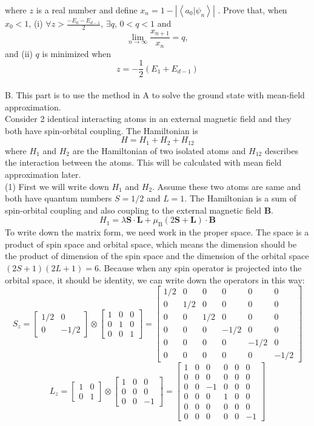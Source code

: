 \documentclass[letterpaper,10pt]{article}
\begin{document}
where $z$ is a real number and define $x_n=1-\left|\left<a_0|\psi_n\right>\right|$
. Prove that, when $x_0<1$, (i) $\forall z >\frac{-E_0-E_{d-1}}{2}$, $\exists q$, $0< q <1$ and $$
\lim _{n\rightarrow \infty} \frac{x_{n+1}}{x_n}=q,
$$
and (ii) $q$ is minimized when $$z=-\frac{1}{2}\left(E_1+E_{d-1}\right)$$\\
{\large{B}}. This part is to use the method in A to solve the ground state with mean-field approximation. \\
\indent Consider 2 identical interacting atoms in an external magnetic field and they both have spin-orbital coupling. The Hamiltonian is 
$$
H=H_1+H_2+H_{12}
$$
where $H_1$ and $H_2$ are the Hamiltonian of two isolated atoms and $H_{12}$ describes the interaction between the atoms. This will be calculated with mean field approximation later. \\
\indent (1) First we will write down $H_{1}$ and $H_2$. Assume these two atoms are same and both have quantum numbers $S=1/2$ and $L=1$. The Hamiltonian is a sum of spin-orbital coupling and also coupling to the external magnetic field $\bm{B}$.
$$H_1=\lambda \bm{S}\cdot\bm{L}+\mu_{\mathrm{B}}(2\bm{S}+\bm{L})\cdot\bm{B}
$$
To write down the matrix form, we need work in the proper space. The space is a product of spin space and orbital space, which means the dimension should be the product of dimension of the spin space and the dimension of the orbital space $(2S+1)(2L+1)=6$. Because when any spin operator is projected into the orbital space, it should be identity, we can write down the operators in this way:
$$S_z=\begin{bmatrix}
1/2 & 0\\
0 & -1/2
\end{bmatrix} \otimes \begin{bmatrix}
1 &0 &0\\
0 & 1 & 0 \\
0 &0 &1
\end{bmatrix}=\begin{bmatrix}
1/2 &0 &0 &0 &0 &0\\
0 &1/2 &0 &0 &0 &0\\
0 &0 &1/2 &0 &0 &0\\
0 &0 &0 &-1/2 &0 &0\\
0 &0 &0 &0 &-1/2 &0\\
0 &0 &0 &0 &0 &-1/2
\end{bmatrix}
$$
$$L_z=\begin{bmatrix}
1 & 0\\
0 & 1
\end{bmatrix} \otimes \begin{bmatrix}
1 &0 &0\\
0 & 0 & 0 \\
0 &0 &-1
\end{bmatrix}=\begin{bmatrix}
1 &0 &0 &0 &0 &0\\
0 &0 &0 &0 &0 &0\\
0 &0 &-1 &0 &0 &0\\
0 &0 &0 &1 &0 &0\\
0 &0 &0 &0 &0 &0\\
0 &0 &0 &0 &0 &-1
\end{bmatrix}
$$
\end{document}
